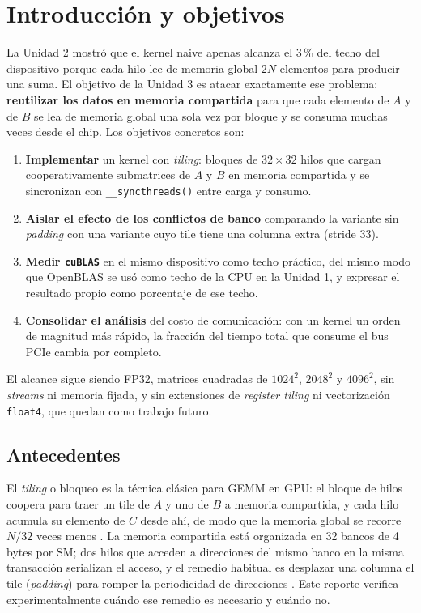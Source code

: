 \section{Introducción y objetivos}

	La Unidad 2 mostró que el kernel naive apenas alcanza el 3\,\% del techo del dispositivo porque cada hilo lee de memoria global $2N$ elementos para producir una suma. El objetivo de la Unidad 3 es atacar exactamente ese problema: \textbf{reutilizar los datos en memoria compartida} para que cada elemento de $A$ y de $B$ se lea de memoria global una sola vez por bloque y se consuma muchas veces desde el chip. Los objetivos concretos son:

	\begin{enumerate}
		\item \textbf{Implementar} un kernel con \textit{tiling}: bloques de $32 \times 32$ hilos que cargan cooperativamente submatrices de $A$ y $B$ en memoria compartida y se sincronizan con \texttt{\_\_syncthreads()} entre carga y consumo.
		\item \textbf{Aislar el efecto de los conflictos de banco} comparando la variante sin \textit{padding} con una variante cuyo tile tiene una columna extra (stride $33$).
		\item \textbf{Medir \texttt{cuBLAS}} en el mismo dispositivo como techo práctico, del mismo modo que OpenBLAS se usó como techo de la CPU en la Unidad 1, y expresar el resultado propio como porcentaje de ese techo.
		\item \textbf{Consolidar el análisis} del costo de comunicación: con un kernel un orden de magnitud más rápido, la fracción del tiempo total que consume el bus PCIe cambia por completo.
	\end{enumerate}

	El alcance sigue siendo FP32, matrices cuadradas de $1024^2$, $2048^2$ y $4096^2$, sin \textit{streams} ni memoria fijada, y sin extensiones de \textit{register tiling} ni vectorización \texttt{float4}, que quedan como trabajo futuro.

\subsection{Antecedentes}

	El \textit{tiling} o bloqueo es la técnica clásica para GEMM en GPU: el bloque de hilos coopera para traer un tile de $A$ y uno de $B$ a memoria compartida, y cada hilo acumula su elemento de $C$ desde ahí, de modo que la memoria global se recorre $N/32$ veces menos \cite{kirkhwu}. La memoria compartida está organizada en 32 bancos de 4 bytes por SM; dos hilos que acceden a direcciones del mismo banco en la misma transacción serializan el acceso, y el remedio habitual es desplazar una columna el tile (\textit{padding}) para romper la periodicidad de direcciones \cite{nvidia}. Este reporte verifica experimentalmente cuándo ese remedio es necesario y cuándo no.

